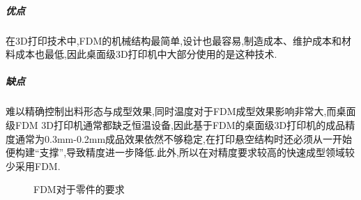 \documentclass[a4paper,12pt,onecolumn,twoside]{article}
\begin{document}
\subparagraph{优点}
在3D打印技术中,FDM的机械结构最简单,设计也最容易,制造成本、维护成本和材料成本也最低,因此桌面级3D打印机中大部分使用的是这种技术.
\subparagraph{缺点}
难以精确控制出料形态与成型效果,同时温度对于FDM成型效果影响非常大,而桌面级FDM 3D打印机通常都缺乏恒温设备,因此基于FDM的桌面级3D打印机的成品精度通常为0.3mm-0.2mm成品效果依然不够稳定,在打印悬空结构时还必须从一开始便构建“支撑”,导致精度进一步降低.此外,所以在对精度要求较高的快速成型领域较少采用FDM.
\begin{figure}[htbp]
\centering
{}
\caption{FDM对于零件的要求}
\end{figure}
\\
\end{document}
